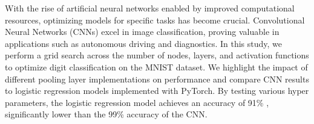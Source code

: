 With the rise of artificial neural networks enabled by improved computational resources, optimizing models for specific tasks has become crucial. Convolutional Neural Networks (CNNs) excel in image classification, proving valuable in applications such as autonomous driving and diagnostics. In this study, we perform a grid search across the number of nodes, layers, and activation functions to optimize digit classification on the MNIST dataset. We highlight the impact of different pooling layer implementations on performance and compare CNN results to logistic regression models implemented with PyTorch. By testing various hyper parameters, the logistic regression model achieves an accuracy of 91\% , significantly lower than the 99\% accuracy of the CNN.